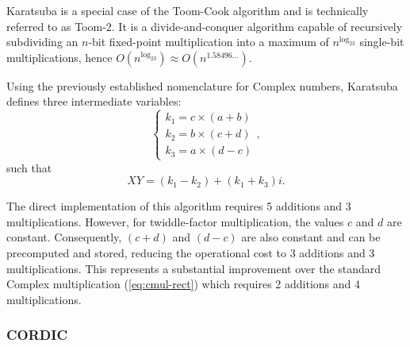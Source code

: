 Karatsuba is a special case of the Toom-Cook algorithm and is technically referred to as Toom-2. It is a divide-and-conquer algorithm capable of recursively subdividing an $n$-bit fixed-point multiplication into a maximum of $n^{\log_23}$ single-bit multiplications, hence $O(n^{\log_23}) \approx O(n^{1.58496\ldots})$.

Using the previously established nomenclature for Complex numbers, Karatsuba defines three intermediate variables:
%
\begin{equation*}
  \begin{cases}
    k_1 = c {\times} (a+b) \\
    k_2 = b {\times} (c+d) \\
    k_3 = a {\times} (d-c)
  \end{cases},
\end{equation*}
%
such that
%
\begin{equation}\label{eq:kara}
  XY = (k_1 - k_2) + (k_1 + k_3)i.
\end{equation}

%

The direct implementation of this algorithm requires 5 additions and 3 multiplications. However, for twiddle-factor multiplication, the values $c$ and $d$ are constant. Consequently, $(c+d)$ and $(d-c)$ are also constant and can be precomputed and stored, reducing the operational cost to 3 additions and 3 multiplications. This represents a substantial improvement over the standard Complex multiplication (\ref{eq:cmul-rect}) which requires 2 additions and 4 multiplications.

\subsubsection{CORDIC}\label{sec:cordic}


